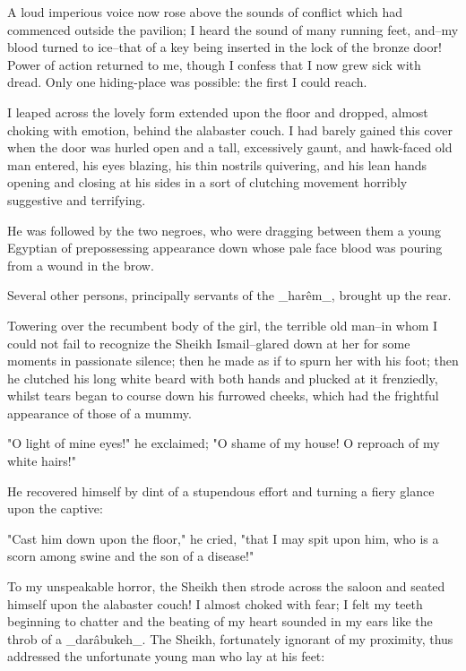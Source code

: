 A loud imperious voice now rose above the sounds of conflict which had
commenced outside the pavilion; I heard the sound of many running
feet, and--my blood turned to ice--that of a key being inserted in the
lock of the bronze door! Power of action returned to me, though I
confess that I now grew sick with dread. Only one hiding-place was
possible: the first I could reach.

I leaped across the lovely form extended upon the floor and dropped,
almost choking with emotion, behind the alabaster couch. I had barely
gained this cover when the door was hurled open and a tall,
excessively gaunt, and hawk-faced old man entered, his eyes blazing,
his thin nostrils quivering, and his lean hands opening and closing at
his sides in a sort of clutching movement horribly suggestive and
terrifying.

He was followed by the two negroes, who were dragging between them a
young Egyptian of prepossessing appearance down whose pale face blood
was pouring from a wound in the brow.

Several other persons, principally servants of the _harêm_, brought
up the rear.

Towering over the recumbent body of the girl, the terrible old man--in
whom I could not fail to recognize the Sheikh Ismail--glared down at
her for some moments in passionate silence; then he made as if to
spurn her with his foot; then he clutched his long white beard with
both hands and plucked at it frenziedly, whilst tears began to course
down his furrowed cheeks, which had the frightful appearance of those
of a mummy.

"O light of mine eyes!" he exclaimed; "O shame of my house! O
reproach of my white hairs!"

He recovered himself by dint of a stupendous effort and turning a
fiery glance upon the captive:

"Cast him down upon the floor," he cried, "that I may spit upon him,
who is a scorn among swine and the son of a disease!"

To my unspeakable horror, the Sheikh then strode across the saloon and
seated himself upon the alabaster couch! I almost choked with fear; I
felt my teeth beginning to chatter and the beating of my heart sounded
in my ears like the throb of a _darâbukeh_. The Sheikh, fortunately
ignorant of my proximity, thus addressed the unfortunate young man who
lay at his feet:

